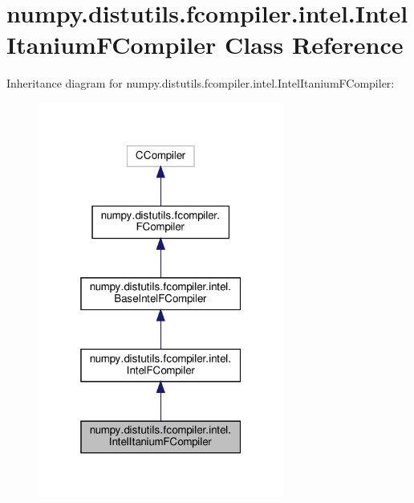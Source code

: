 \hypertarget{classnumpy_1_1distutils_1_1fcompiler_1_1intel_1_1IntelItaniumFCompiler}{}\section{numpy.\+distutils.\+fcompiler.\+intel.\+Intel\+Itanium\+F\+Compiler Class Reference}
\label{classnumpy_1_1distutils_1_1fcompiler_1_1intel_1_1IntelItaniumFCompiler}


Inheritance diagram for numpy.\+distutils.\+fcompiler.\+intel.\+Intel\+Itanium\+F\+Compiler\+:
\nopagebreak
\begin{figure}[H]
\begin{center}
\leavevmode
\includegraphics[width=229pt]{classnumpy_1_1distutils_1_1fcompiler_1_1intel_1_1IntelItaniumFCompiler__inherit__graph}
\end{center}
\end{figure}


